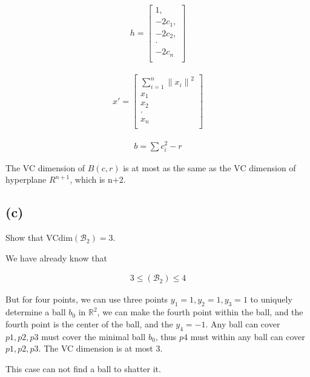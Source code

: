 \documentclass{article}
\begin{document}
\begin{align}
    h =
    \begin{bmatrix}
        1,       \\
        -2c_{1}, \\
        -2c_{2}, \\
        \cdot    \\
        -2c_{n}  \\
    \end{bmatrix}
\end{align}


\begin{align}
    x' =
    \begin{bmatrix}
        \sum_{i=1}^{n} {\|x_{i}\|}^2 \\
        x_{1}                        \\
        x_{2}                        \\
        \cdot                        \\
        x_{n}                        \\
    \end{bmatrix}
\end{align}


\begin{align}
    b = \sum c_{i}^{2} - r
\end{align}

The VC dimension of $B(c, r)$ is at most as the same as the VC dimension of hyperplane $R^{n+1}$, which is n+2.


\subsection*{(c)}
Show that VCdim$\left(\mathcal{B}_{2}\right)=3$.

We have already know that

\begin{align}
    3 \leq \left(\mathcal{B}_{2}\right) \leq 4
\end{align}

But for four points, we can use three points $y_1=1, y_2=1, y_3=1$ to uniquely determine a ball $b_0$ in $\mathbb{R}^{2}$, we can make the fourth point within the ball, and the fourth point is the center of the ball, and the $y_4 = -1$. Any ball can cover $p1, p2, p3$ must cover the minimal ball $b_0$, thus $p4$ must within any ball can cover $p1, p2, p3$. The VC dimension is at most 3.

This case can not find a ball to shatter it.
\end{document}

